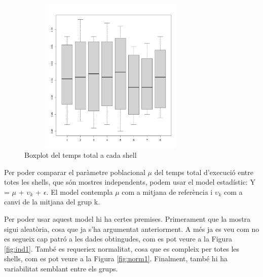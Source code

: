 \documentclass[12pt]{article}
\begin{document}
\begin{figure}[h!]
  \centering
  \includegraphics[width=9cm, height=7.5cm]{boxplot.jpg}
  \caption{Boxplot del temps total a cada shell}
  \label{fig:boxplot}
\end{figure} 

\newpage
Per poder comparar el paràmetre poblacional $\mu$ del temps total d'execució entre totes les shells, que són mostres independents,
podem usar el model estadístic: Y = $\mu$ + $\upsilon_{k}$ + $\epsilon$. El model contempla $\mu$ com a mitjana de referència i $\upsilon_{k}$ 
com a canvi de la mitjana del grup k.

Per poder usar aquest model hi ha certes premises. Primerament que la mostra sigui aleatòria, cosa que ja s'ha argumentat anteriorment.
A més ja es veu com no es segueix cap patró a les dades obtingudes, com es pot veure a la Figura \ref{fig:ind1}. També es requeriex 
normalitat, cosa que es compleix per totes les shells, com es pot veure a la Figura \ref{fig:norm1}. Finalment, també hi ha variabilitat 
semblant entre els grups.
\end{document}
